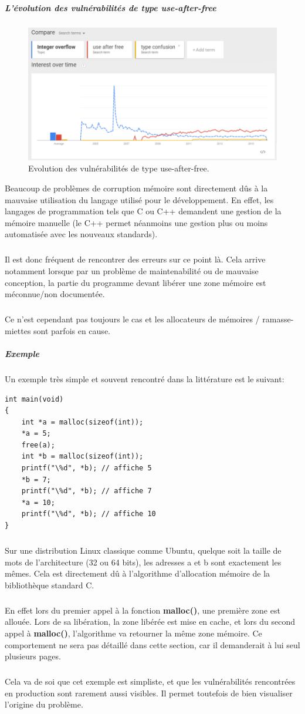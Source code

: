 \subparagraph{L'évolution des vulnérabilités de type use-after-free}
\begin{figure}[h]
    \centering
    \includegraphics[scale=0.5]{histogramme-uaf.png}
    \caption{Evolution des vulnérabilités de type use-after-free.}
\end{figure}
Beaucoup de problèmes de corruption mémoire sont directement dûs à la mauvaise utilisation
du langage utilisé pour le développement. En effet, les langages de programmation tels que C
ou C++ demandent une gestion de la mémoire manuelle (le C++ permet néanmoins une gestion plus ou moins automatisée
avec les nouveaux standards).
\subparagraph{}
Il est donc fréquent de rencontrer des erreurs sur ce point là. Cela arrive
notamment lorsque par un problème de maintenabilité ou de mauvaise conception, la partie du programme devant
libérer une zone mémoire est méconnue/non documentée.\subparagraph{}
Ce n'est cependant pas toujours le cas et les allocateurs de mémoires / ramasse-miettes sont parfois en cause.

\subparagraph{Exemple}
Un exemple très simple et souvent rencontré dans la littérature est le suivant:
\begin {lstlisting}[frame=single]
int main(void)
{
    int *a = malloc(sizeof(int));
    *a = 5;
    free(a);
    int *b = malloc(sizeof(int));
    printf("\%d", *b); // affiche 5
    *b = 7;
    printf("\%d", *b); // affiche 7
    *a = 10;
    printf("\%d", *b); // affiche 10
}
\end{lstlisting}
\subparagraph{}
Sur une distribution Linux classique comme Ubuntu, quelque soit la taille de mots
de l'architecture (32 ou 64 bits), les adresses a et b sont exactement les mêmes.
Cela est directement dû à l'algorithme d'allocation mémoire de la bibliothèque standard
C.\subparagraph{}
En effet lors du premier appel à la fonction \textbf{malloc()}, une première zone est allouée.
Lors de sa libération, la zone libérée est mise en cache, et lors du second appel à \textbf{malloc()},
l'algorithme va retourner la même zone mémoire. Ce comportement ne sera pas détaillé dans cette section, car
il demanderait à lui seul plusieurs pages.\subparagraph{}
Cela va de soi que cet exemple est simpliste, et que les vulnérabilités rencontrées en production sont
rarement aussi visibles. Il permet toutefois de bien visualiser l'origine du problème.


